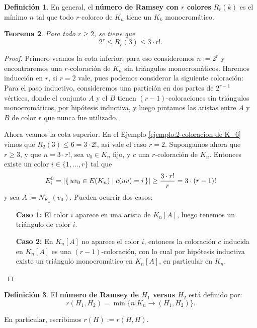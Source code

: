 \documentclass[12pt]{report}
\theoremstyle{plain}
\newtheorem{theorem}{Teorema}[section]
\theoremstyle{definition}
\newtheorem{definition}[theorem]{Definición}
\newcommand{\abs}[1]{\left \vert #1 \right \vert}
\begin{document}
\begin{definition}
En general, el \textbf{número de Ramsey con $r$ colores} $R_r (k)$ es el mínimo $n$ tal que todo $r$-coloreo de $K_n$ tiene un $K_k$ monocromático.
\end{definition}

\begin{theorem}
Para todo $r \geq 2$, se tiene que
\[
    2^r \leq R_r (3) \leq 3 \cdot r!.
\]
\end{theorem}
\begin{proof}
Primero veamos la cota inferior, para eso consideremos $n:= 2^r$ y encontraremos una $r$-coloración de $K_n$ sin triángulos monocromáticos. Haremos inducción en $r$, si $r = 2$ vale, pues podemos considerar la siguiente coloración:
Para el paso inductivo, consideremos una partición en dos partes de $2^{r-1}$ vértices, donde el conjunto $A$ y el $B$ tienen $(r-1)$-coloraciones sin triángulos monocromáticos, por hipótesis inductiva, y luego pintamos las aristas entre $A$ y $B$ de color $r$ que nunca fue utilizado.

Ahora veamos la cota superior. En el Ejemplo \ref{ejemplo:2-coloracion de K_6} vimos que $R_2(3) \leq 6 = 3 \cdot 2 !$, así vale el caso $r = 2$. Supongamos ahora que $r \geq 3$, y que $n = 3 \cdot r!$, sea $v_0 \in K_n$ fijo, y $c$ una $r$-coloración de $K_n$. Entonces existe un color $i \in  \{1, \ldots, r\}$ tal que
\[
    E_i^0 = \abs{\set{uv_0 \in E(K_n) | c (uv) = i}} \geq \frac{3 \cdot r !}{r} = 3 \cdot (r-1)!
\]
y sea $A := N_{K_n}^i (v_0)$. Pueden ocurrir dos casos:
\begin{enumerate}
\item[\textbf{Caso 1:}] El color $i$ aparece en una arista de $K_n [A]$, luego tenemos un triángulo de color $i$.
\item[\textbf{Caso 2:}] En $K_n [A]$ no aparece el color $i$, entonces la coloración $c$ inducida en $K_n [A]$ es una $(r-1)$-coloración, con lo cual por hipótesis inductiva existe un triángulo monocromático en $K_n [A]$, en particular en $K_n$.
\end{enumerate}

\end{proof}


\begin{definition}
El \textbf{número de Ramsey de $H_1$ versus $H_2$} está definido por:
\[
    r(H_1, H_2) = \min \{ n | K_n \to (H_1, H_2)\}.
\]

En particular, escribimos $r (H):= r (H,H)$.
\end{definition}
\end{document}
